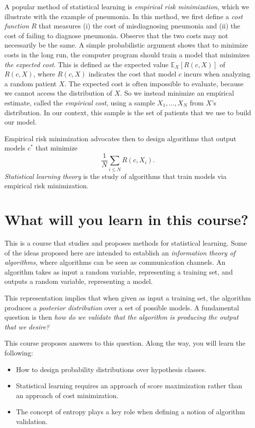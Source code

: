 A popular method of statistical learning is \emph{empirical risk minimization},
which we illustrate with the example of pneumonia.
In this method, we first define a \emph{cost function} $R$ that measures (i) the
cost of misdiagnosing pneumonia and (ii) the cost of failing to diagnose
pneumonia. Observe that the two costs may not necessarily be the same.
A simple probabilistic argument shows that to minimize costs in the
long run, the computer program should train a model that minimizes \emph{the
expected cost}. This is defined as the expected value $\mathbb{E}_X\left[R(c, X)\right]$ of $R(c,X)$,
where $R(c, X)$ indicates the cost that model $c$ incurs when analyzing a
random patient $X$.
The expected cost is often impossible to evaluate, because we cannot
access the distribution of $X$. So we instead minimize an empirical estimate, called the \emph{empirical cost}, using a sample $X_1, \ldots, X_N$ from $X$'s distribution. In our context, this sample is the set of patients that we use
to build our model.

Empirical risk minimization advocates then to design algorithms that
output models $c^*$ that minimize
%
\begin{equation}
\frac{1}{N}\sum_{i \leq N}R(c, X_i).
\end{equation}
%
\emph{Statistical learning theory} is the study of algorithms that train models
via empirical risk minimization.

\section*{What will you learn in this course?}

This is a course that studies and proposes methods for statistical learning.
Some of the ideas proposed here are intended to establish an \emph{information
theory of algorithms}, where algorithms can be seen as communication
channels. An algorithm takes as input a random variable, representing a
training set, and outputs a random variable, representing a model.

This representation implies that when given as input a training
set, the algorithm produces a \emph{posterior distribution} over a set of possible
models. A fundamental question is then \emph{how do we validate that the
algorithm is producing the output that we desire?}

This course proposes answers to this question. Along the way, you will
learn the following:

\begin{itemize}
\item How to design probability distributions over hypothesis classes.
\item Statistical learning requires an approach of score maximization rather
than an approach of cost minimization.
\item The concept of entropy plays a key role when defining a notion of
algorithm validation.
\end{itemize}

